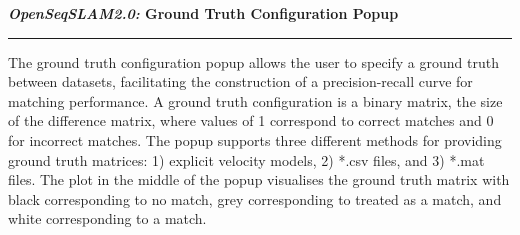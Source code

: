 \centerline{\textbf{\textit{OpenSeqSLAM2.0:} Ground Truth Configuration Popup}}
\noindent\rule{\textwidth}{2pt}
\bigskip
\parbox{\textwidth}{The ground truth configuration popup allows the user to specify a ground truth between datasets, facilitating the construction of a precision-recall curve for matching performance. A ground truth configuration is a binary matrix, the size of the difference matrix, where values of 1 correspond to correct matches and 0 for incorrect matches. The popup supports three different methods for providing ground truth matrices: 1) explicit velocity models, 2) *.csv files, and 3) *.mat files. The plot in the middle of the popup visualises the ground truth matrix with black corresponding to no match, grey corresponding to treated as a match, and white corresponding to a match.}
